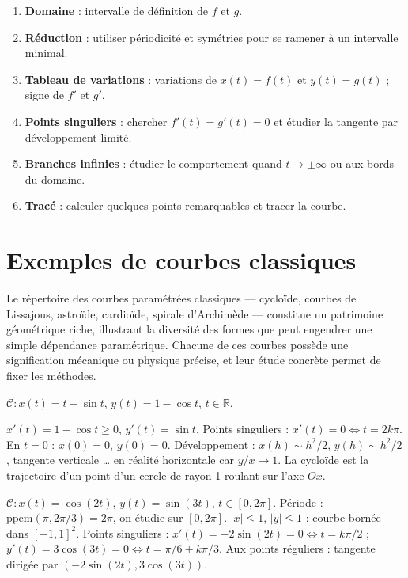 \documentclass[11pt,a4paper,twoside]{book}
\newcommand{\R}{\mathbb{R}}
\begin{document}
\begin{methodebox}
\begin{enumerate}
  \item \textbf{Domaine} : intervalle de définition de $f$ et $g$.
  \item \textbf{Réduction} : utiliser périodicité et symétries pour se ramener à un intervalle minimal.
  \item \textbf{Tableau de variations} : variations de $x(t)=f(t)$ et $y(t)=g(t)$ ; signe de $f'$ et $g'$.
  \item \textbf{Points singuliers} : chercher $f'(t)=g'(t)=0$ et étudier la tangente par développement limité.
  \item \textbf{Branches infinies} : étudier le comportement quand $t \to \pm\infty$ ou aux bords du domaine.
  \item \textbf{Tracé} : calculer quelques points remarquables et tracer la courbe.
\end{enumerate}
\end{methodebox}

\section{Exemples de courbes classiques}

Le répertoire des courbes paramétrées classiques — cycloïde, courbes de Lissajous, astroïde, cardioïde, spirale d'Archimède — constitue un patrimoine géométrique riche, illustrant la diversité des formes que peut engendrer une simple dépendance paramétrique. Chacune de ces courbes possède une signification mécanique ou physique précise, et leur étude concrète permet de fixer les méthodes.

\begin{exemplebox}
$\mathcal{C} : x(t) = t - \sin t$, $y(t) = 1 - \cos t$, $t \in \R$.

$x'(t) = 1-\cos t \geq 0$, $y'(t) = \sin t$.
Points singuliers : $x'(t)=0 \iff t = 2k\pi$. En $t=0$ : $x(0)=0$, $y(0)=0$.
Développement : $x(h) \sim h^2/2$, $y(h) \sim h^2/2$, tangente verticale … en réalité horizontale car $y/x \to 1$.
La cycloïde est la trajectoire d'un point d'un cercle de rayon 1 roulant sur l'axe $Ox$.
\end{exemplebox}

\begin{exemplebox}
$\mathcal{C} : x(t) = \cos(2t)$, $y(t) = \sin(3t)$, $t \in [0, 2\pi]$.
Période : $\mathrm{ppcm}(\pi, 2\pi/3) = 2\pi$, on étudie sur $[0, 2\pi]$.
$|x| \leq 1$, $|y| \leq 1$ : courbe bornée dans $[-1,1]^2$.
Points singuliers : $x'(t) = -2\sin(2t) = 0 \iff t = k\pi/2$ ; $y'(t) = 3\cos(3t) = 0 \iff t = \pi/6+k\pi/3$.
Aux points réguliers : tangente dirigée par $(-2\sin(2t), 3\cos(3t))$.
\end{exemplebox}
\end{document}
